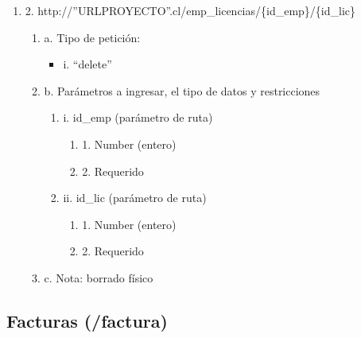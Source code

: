 \begin{enumerate}
    \item 2. http://”URLPROYECTO”.cl/emp\_licencias/\{id\_emp\}/\{id\_lic\}
    \begin{enumerate}
        \item a. Tipo de petición:
            \begin{itemize}
               \item i. “delete”
            \end{itemize}
        \item b. Parámetros a ingresar, el tipo de datos y restricciones
            \begin{enumerate}
                \item i. id\_emp (parámetro de ruta)
                    \begin{enumerate}
                        \item 1. Number (entero)
                        \item 2. Requerido
                    \end{enumerate}
                \item ii. id\_lic (parámetro de ruta)
                    \begin{enumerate}
                        \item 1. Number (entero)
                        \item 2. Requerido
                    \end{enumerate}
            \end{enumerate}
        \item c. Nota: borrado físico
    \end{enumerate}
\end{enumerate}

\subsection{Facturas (/factura)}

